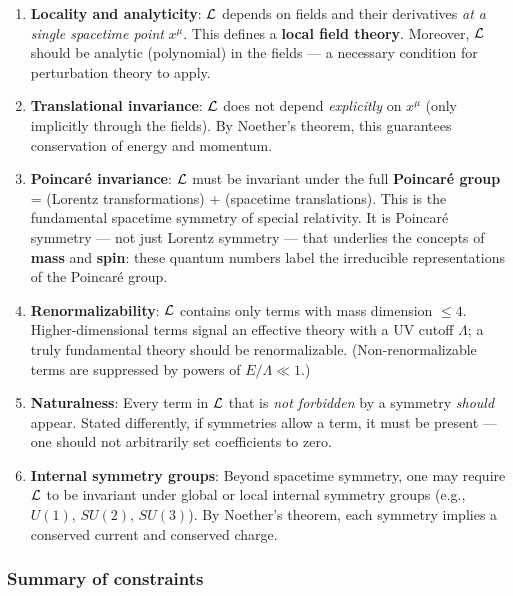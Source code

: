 \documentclass[../main.tex]{subfiles}
\begin{document}
\begin{enumerate}
  \item \textbf{Locality and analyticity}: $\mathcal{L}$ depends on fields and their derivatives \emph{at a single spacetime point} $x^\mu$.  This defines a \textbf{local field theory}.  Moreover, $\mathcal{L}$ should be analytic (polynomial) in the fields — a necessary condition for perturbation theory to apply.

  \item \textbf{Translational invariance}: $\mathcal{L}$ does not depend \emph{explicitly} on $x^\mu$ (only implicitly through the fields).  By Noether's theorem, this guarantees conservation of energy and momentum.

  \item \textbf{Poincaré invariance}: $\mathcal{L}$ must be invariant under the full \textbf{Poincaré group} = (Lorentz transformations) + (spacetime translations).  This is the fundamental spacetime symmetry of special relativity.  It is Poincaré symmetry — not just Lorentz symmetry — that underlies the concepts of \textbf{mass} and \textbf{spin}: these quantum numbers label the irreducible representations of the Poincaré group.

  \item \textbf{Renormalizability}: $\mathcal{L}$ contains only terms with mass dimension $\leq 4$.  Higher-dimensional terms signal an effective theory with a UV cutoff $\Lambda$; a truly fundamental theory should be renormalizable.  (Non-renormalizable terms are suppressed by powers of $E/\Lambda \ll 1$.)

  \item \textbf{Naturalness}: Every term in $\mathcal{L}$ that is \emph{not forbidden} by a symmetry \emph{should} appear.  Stated differently, if symmetries allow a term, it must be present — one should not arbitrarily set coefficients to zero.

  \item \textbf{Internal symmetry groups}: Beyond spacetime symmetry, one may require $\mathcal{L}$ to be invariant under global or local internal symmetry groups (e.g., $U(1)$, $SU(2)$, $SU(3)$).  By Noether's theorem, each symmetry implies a conserved current and conserved charge.

\end{enumerate}

\subsubsection*{Summary of constraints}
\end{document}
